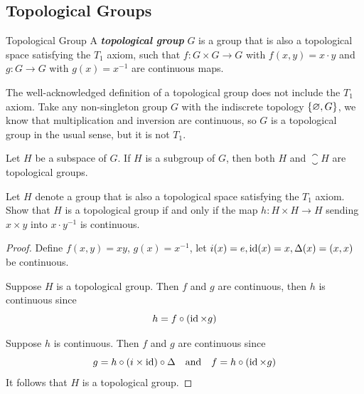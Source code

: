 \documentclass[12pt,a4paper]{article}
\begin{document}
    \subsection{Topological Groups}
    \begin{defi}{Topological Group}
        A \textbf{\textit{topological group}} $G$ is a group that is also a topological space satisfying the $T_1$ axiom, such that $f:G\times G\to G$ with $f(x,y)=x\cdot y$ and $g:G\to G$ with $g(x)=x^{-1}$ are continuous maps.
    \end{defi}
    \begin{remark}
        The well-acknowledged definition of a topological group does not include the $T_1$ axiom. Take any non-singleton group $G$ with the indiscrete topology $\left\{\varnothing,G\right\}$, we know that multiplication and inversion are continuous, so $G$ is a topological group in the usual sense, but it is not $T_1$.
    \end{remark}
    \hfill

    \begin{thm}
        Let $H$ be a subspace of $G$. If $H$ is a subgroup of $G$, then both $H$ and $\closure{H}$ are topological groups.
    \end{thm}

    \begin{ex}
        Let $H$ denote a group that is also a topological space satisfying the $T_1$ axiom. Show that $H$ is a topological group if and only if the map $h:H\times H\to H$ sending $x\times y$ into $x\cdot y^{-1}$ is continuous.
    \end{ex}
    \begin{proof}
        Define $f(x,y)=xy$, $g(x)=x^{-1}$, let $i(x)=e, \operatorname{id}(x)=x, \Delta(x)=(x,x)$ be continuous. 

        Suppose $H$ is a topological group. Then $f$ and $g$ are continuous, then $h$ is continuous since
        $$
        h=f\circ(\operatorname{id}\times g)
        $$

        Suppose $h$ is continuous. Then $f$ and $g$ are continuous since
        $$
        g=h\circ(i\times\operatorname{id})\circ\Delta\quad\text{and}\quad f=h\circ(\operatorname{id}\times g)
        $$
        It follows that $H$ is a topological group.
    \end{proof}
    \hfill
\end{document}
